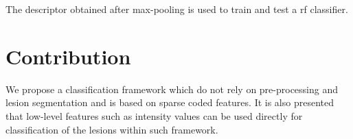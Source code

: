 The descriptor obtained after max-pooling is used to train and test a \ac{rf} classifier. 

\section{Contribution}
We propose a classification framework which do not rely on pre-processing and lesion segmentation and is based on sparse coded features. It is also presented that low-level features such as intensity values can be used directly for classification of the lesions within such framework. 




